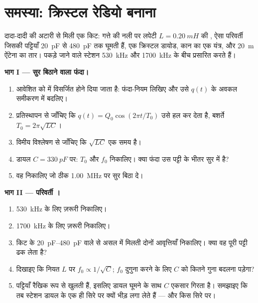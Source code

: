 \section{समस्या: क्रिस्टल रेडियो बनाना}

\begin{problem}
\label{pb:g12:rlc-oscillations:1}
दादा-दादी की अटारी से मिली एक किट: गत्ते की नली पर लपेटी $L = \qty{0.20}{mH}$ की
, ऐसा परिवर्ती  जिसकी पट्टियाँ \qty{20}{pF} से
\qty{480}{pF} तक घूमती हैं, एक क्रिस्टल डायोड, कान का एक यंत्र, और \qty{20}{m} ऐंटेना का
तार। पकड़े जाने वाले स्टेशन \qty{530}{kHz} और \qty{1700}{kHz} के बीच प्रसारित करते हैं।

\medskip
\noindent\textbf{भाग I --- सुर बिठाने वाला फंदा।}
\begin{enumerate}
  \item आवेशित  को  में विसर्जित होने दिया
        जाता है: फंदा-नियम लिखिए और उसे $q(t)$ के अवकल समीकरण में बदलिए।
  \item प्रतिस्थापन से जाँचिए कि $q(t) = Q_0\cos(2\pi t/T_0)$ उसे हल कर देता है, बशर्ते $T_0 = 2\pi\sqrt{LC}$।
  \item विमीय विश्लेषण से जाँचिए कि $\sqrt{LC}$ एक समय है।
  \item डायल $C = \qty{330}{pF}$ पर: $T_0$ और $f_0$ निकालिए। क्या फंदा उस पट्टी के
        भीतर सुर में है?
  \item वह  निकालिए जो ठीक \qty{1.00}{MHz} पर सुर बिठा दे।
\end{enumerate}

\medskip
\noindent\textbf{भाग II --- परिवर्ती ।}
\begin{enumerate}[resume]
  \item \qty{530}{kHz} के लिए ज़रूरी  निकालिए।
  \item \qty{1700}{kHz} के लिए ज़रूरी  निकालिए।
  \item किट के \qtyrange{20}{480}{pF} वाले  से असल में मिलती
        दोनों आवृत्तियाँ निकालिए। क्या वह पूरी पट्टी ढक लेता है?
  \item दिखाइए कि नियत $L$ पर $f_0 \propto 1/\sqrt{C}$; $f_0$ दुगुना करने के लिए $C$
        को कितने गुना बदलना पड़ेगा?
  \item पट्टियाँ रैखिक रूप से खुलती हैं, इसलिए डायल घूमने के साथ $C$
        एकसार गिरता है। समझाइए कि तब स्टेशन डायल के एक ही सिरे पर क्यों भीड़
        लगा लेते हैं --- और किस सिरे पर।
\end{enumerate}


\end{problem}
